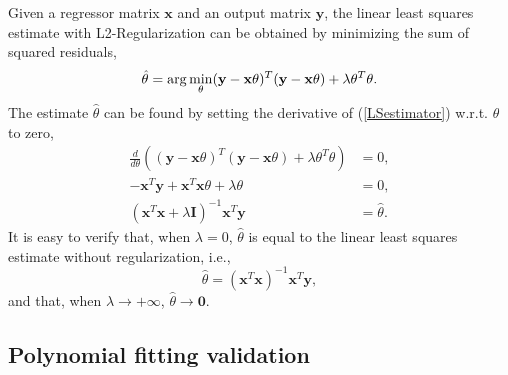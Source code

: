 \documentclass[]{article}
\begin{document}
Given a regressor matrix $\mathbf{x}$ and an output matrix $\mathbf{y}$, the linear least squares estimate with L2-Regularization can be obtained by minimizing the sum of squared residuals,
\begin{equation}{\label{LSestimator}}
\hat{\theta} = \arg\min\limits_{\theta}(\mathbf{y}-\mathbf{x}\theta)^T(\mathbf{y}-\mathbf{x}\theta)+\lambda\theta^T\theta.
\end{equation}
The estimate $\hat{\theta}$ can be found by setting the derivative of (\ref{LSestimator}) w.r.t. $\theta$ to zero,
\begin{subequations}\label{LSderivative}
		\begin{align}
		\frac{d}{d\theta}\left((\mathbf{y}-\mathbf{x}\theta)^T(\mathbf{y}-\mathbf{x}\theta)+\lambda\theta^T\theta \right) &= 0,\\
		-\mathbf{x}^T\mathbf{y}+\mathbf{x}^T\mathbf{x}\theta+\lambda\theta &=0,\\
		(\mathbf{x}^T\mathbf{x}+\lambda\mathbf{I})^{-1}\mathbf{x}^T\mathbf{y} &=\hat{\theta}.
		\end{align}
\end{subequations}
It is easy to verify that, when $\lambda=0$, $\hat{\theta}$ is equal to the linear least squares estimate without regularization, i.e.,
\begin{equation}
\hat{\theta} = (\mathbf{x}^T\mathbf{x})^{-1}\mathbf{x}^T\mathbf{y},
\end{equation}
and that, when $\lambda\rightarrow +\infty$, $\hat{\theta}\rightarrow \mathbf{0}$.


\subsection{Polynomial fitting validation}
\end{document}
